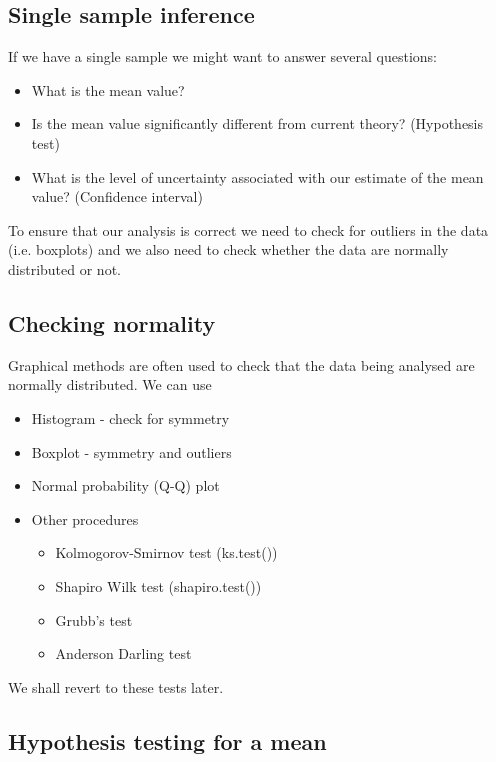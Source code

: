\documentclass[a4paper,12pt]{article}
\begin{document}
\subsection{Single sample inference}

If we have a single sample we might want to answer several
questions:
\begin{itemize}
\item What is the mean value? \item Is the mean value
significantly different from current theory? (Hypothesis test)
\item What is the level of uncertainty associated with our
estimate of the mean value? (Confidence interval)
\end{itemize}
To ensure that our analysis is correct we need to check for
outliers in the data (i.e. boxplots) and we also need to check
whether the data are normally distributed or not.

\subsection{Checking normality}


Graphical methods are often used to check that the data being
analysed are normally distributed. We can use
\begin{itemize}
\item Histogram - check for symmetry \item Boxplot - symmetry and
outliers \item Normal probability (Q-Q) plot

\item Other procedures
\begin{itemize}
\item Kolmogorov-Smirnov test (ks.test())\item Shapiro Wilk test (shapiro.test()) \item
Grubb's test \item Anderson Darling test
\end{itemize}
\end{itemize}
We shall revert to these tests later.




\subsection{Hypothesis testing for a mean}
\end{document}
